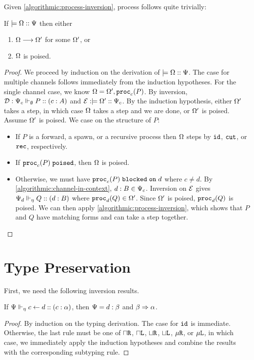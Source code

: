 Given \cref{algorithmic:process-inversion}, process follows quite trivially:

\begin{theorem}[Progress]
If $\models {\Omega} :: {\Psi}$ then either
\begin{enumerate}
  \item $\Omega \longrightarrow \Omega'$ for some $\Omega'$, or
  \item $\Omega$ is poised.
\end{enumerate}
\end{theorem}
\begin{proof}
  We proceed by induction on the derivation of $\models {\Omega} :: {\Psi}$. The case for multiple channels follows immediately from the induction hypotheses. For the single channel case, we know $\Omega = \Omega', \mathtt{proc}_{c}(P)$. By inversion, $\mathcal{D} : {\Psi_c} \Vdash_{\emptyset} P :: (c : A)$ and $\mathcal{E} : \models {\Omega'} :: {\Psi_c}$. By the induction hypothesis, either $\Omega'$ takes a step, in which case $\Omega$ takes a step and we are done, or $\Omega'$ is poised. Assume $\Omega'$ is poised. We case on the structure of $P$:
  \begin{itemize}
    \item If $P$ is a forward, a spawn, or a recursive process then $\Omega$ steps by $\texttt{id}$, $\texttt{cut}$, or $\texttt{rec}$, respectively.
    \item If $\mathtt{proc}_{c}(P)\;\mathtt{poised}$, then $\Omega$ is poised.
    \item Otherwise, we must have ${\mathtt{proc}_{c}(P)}\;\mathtt{blocked\;on}\;{d}$ where $c \neq d$. By \cref{algorithmic:channel-in-context}, $d : B \in \Psi_c$. Inversion on $\mathcal{E}$ gives ${\Psi_d} \Vdash_{\eta} Q :: (d : B)$ where $\mathtt{proc}_{d}(Q) \in \Omega'$. Since $\Omega'$ is poised, $\mathtt{proc}_{d}(Q)$ is poised. We can then apply \cref{algorithmic:process-inversion}, which shows that $P$ and $Q$ have matching forms and can take a step together.
  \end{itemize}
\end{proof}


\section{Type Preservation}

First, we need the following inversion results.

\begin{lemma}[Inversion of Id]
If ${\Psi} \Vdash_{\eta} c \leftarrow d :: (c : \alpha)$, then $\Psi = d : \beta$ and $\beta \mathrel\Rightarrow \alpha$.
\end{lemma}
\begin{proof}
  By induction on the typing derivation. The case for $\texttt{id}$ is immediate. Otherwise, the last rule must be one of $\mathbin{\sqcap}\texttt{R}$, $\mathbin{\sqcap}\texttt{L}$, $\mathbin{\sqcup}\texttt{R}$, $\mathbin{\sqcup}\texttt{L}$, $\mu\texttt{R}$, or $\mu\texttt{L}$, in which case, we immediately apply the induction hypotheses and combine the results with the corresponding subtyping rule.
\end{proof}

